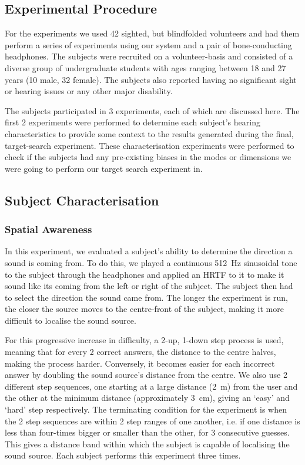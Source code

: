 \documentclass[format=sigconf, review=true, screen=true, anonymous=true]{acmart}
\begin{document}
\subsection{Experimental Procedure}

For the experiments we used 42 sighted, but blindfolded volunteers and had them perform a series of experiments using our system and a pair of bone-conducting headphones. The subjects were recruited on a volunteer-basis and consisted of a diverse group of undergraduate students with ages ranging between 18 and 27 years (10 male, 32 female). The subjects also reported having no significant sight or hearing issues or any other major disability. 

The subjects participated in 3 experiments, each of which are discussed here. The first 2 experiments were performed to determine each subject's hearing characteristics to provide some context to the results generated during the final, target-search experiment. These characterisation experiments were performed to check if the subjects had any pre-existing biases in the modes or dimensions we were going to perform our target search experiment in. 

\subsection{Subject Characterisation}

\subsubsection{Spatial Awareness}

In this experiment, we evaluated a subject's ability to determine the direction a sound is coming from. To do this, we played a continuous \SI{512}{\hertz} sinusoidal tone to the subject through the headphones and applied an HRTF to it to make it sound like its coming from the left or right of the subject. The subject then had to select the direction the sound came from. The longer the experiment is run, the closer the source moves to the centre-front of the subject, making it more difficult to localise the sound source. 

For this progressive increase in difficulty, a 2-up, 1-down step process is used, meaning that for every 2 correct answers, the distance to the centre halves, making the process harder. Conversely, it becomes easier for each incorrect answer by doubling the sound source's distance from the centre. We also use 2 different step sequences, one starting at a large distance (\SI{2}{\m}) from the user and the other at the minimum distance (approximately \SI{3}{\cm}), giving an `easy' and `hard' step respectively. The terminating condition for the experiment is when the 2 step sequences are within 2 step ranges of one another, i.e. if one distance is less than four-times bigger or smaller than the other, for 3 consecutive guesses. This gives a distance band within which the subject is capable of localising the sound source. Each subject performs this experiment three times. 
\end{document}
